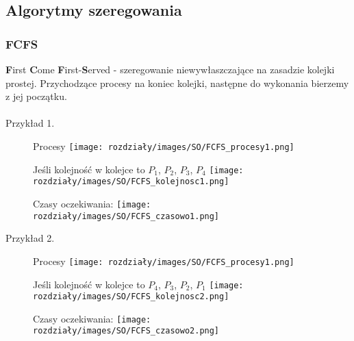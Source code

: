\subsection{Algorytmy szeregowania}
    \subsubsection{FCFS}
    \textbf{F}irst \textbf{C}ome \textbf{F}irst-\textbf{S}erved - szeregowanie niewywłaszczające na zasadzie kolejki prostej. Przychodzące procesy na koniec kolejki, następne do wykonania bierzemy z jej początku.
    \\ \\

    Przykład 1.
    \begin{figure}[!htb]
       \begin{minipage}{0.15\textwidth}
         \centering
         Procesy
         \texttt{[image: rozdziały/images/SO/FCFS\_procesy1.png]}
       \end{minipage}\hfill
       \begin{minipage}{0.5\textwidth}
         \centering
         Jeśli kolejność w kolejce to $P_1$, $P_2$, $P_3$, $P_4$
         \texttt{[image: rozdziały/images/SO/FCFS\_kolejnosc1.png]}
       \end{minipage}\hfill
        \begin{minipage}{0.3\textwidth}
            \centering
            Czasy oczekiwania:
            \texttt{[image: rozdziały/images/SO/FCFS\_czasowo1.png]}
        \end{minipage}
    \end{figure}


    Przykład 2.
    \begin{figure}[!htb]
       \begin{minipage}{0.15\textwidth}
         \centering
         Procesy
         \texttt{[image: rozdziały/images/SO/FCFS\_procesy1.png]}
       \end{minipage}\hfill
       \begin{minipage}{0.5\textwidth}
         \centering
         Jeśli kolejność w kolejce to $P_4$, $P_3$, $P_2$, $P_1$
         \texttt{[image: rozdziały/images/SO/FCFS\_kolejnosc2.png]}
       \end{minipage}\hfill
        \begin{minipage}{0.3\textwidth}
            \centering
            Czasy oczekiwania:
            \texttt{[image: rozdziały/images/SO/FCFS\_czasowo2.png]}
        \end{minipage}
    \end{figure}


